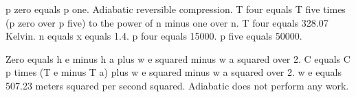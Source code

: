 p zero equals p one. Adiabatic reversible compression. T four equals T five times (p zero over p five) to the power of n minus one over n. T four equals 328.07 Kelvin. n equals x equals 1.4. p four equals 15000. p five equals 50000. 

Zero equals h e minus h a plus w e squared minus w a squared over 2. C equals C p times (T e minus T a) plus w e squared minus w a squared over 2. w e equals 507.23 meters squared per second squared. Adiabatic does not perform any work.